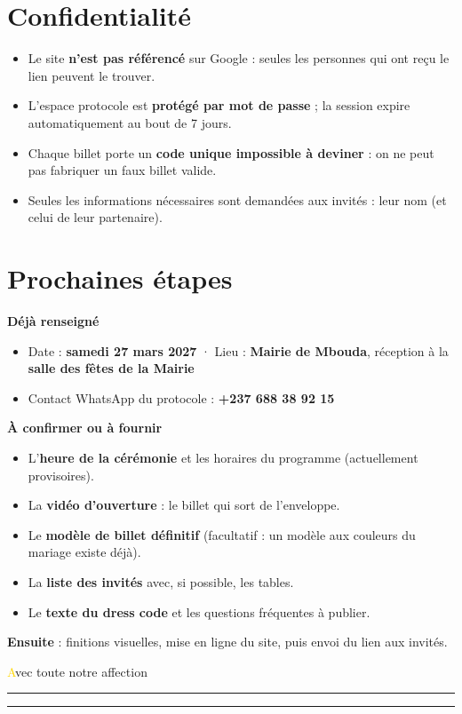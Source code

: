 \documentclass[11pt,a4paper]{article}
\newcommand{\ornament}{%
  \begin{center}
    \textcolor{gold}{\rule[0.6ex]{3.2cm}{0.4pt}\hspace{0.6em}\raisebox{0.15ex}{$\blacklozenge$}\hspace{0.6em}\rule[0.6ex]{3.2cm}{0.4pt}}
  \end{center}}
\begin{document}
\newpage
\section{Confidentialité}

\begin{itemize}
  \item Le site \textbf{n'est pas référencé} sur Google : seules les personnes qui ont reçu le lien peuvent le trouver.
  \item L'espace protocole est \textbf{protégé par mot de passe} ; la session expire automatiquement au bout de 7 jours.
  \item Chaque billet porte un \textbf{code unique impossible à deviner} : on ne peut pas fabriquer un faux billet valide.
  \item Seules les informations nécessaires sont demandées aux invités : leur nom (et celui de leur partenaire).
\end{itemize}

\section{Prochaines étapes}

\begin{note}
\textbf{Déjà renseigné}
\begin{itemize}
  \item Date : \textbf{samedi 27 mars 2027} · Lieu : \textbf{Mairie de Mbouda}, réception à la \textbf{salle des fêtes de la Mairie}
  \item Contact WhatsApp du protocole : \textbf{+237 688 38 92 15}
\end{itemize}

\textbf{À confirmer ou à fournir}
\begin{itemize}
  \item L'\textbf{heure de la cérémonie} et les horaires du programme (actuellement provisoires).
  \item La \textbf{vidéo d'ouverture} : le billet qui sort de l'enveloppe.
  \item Le \textbf{modèle de billet définitif} (facultatif : un modèle aux couleurs du mariage existe déjà).
  \item La \textbf{liste des invités} avec, si possible, les tables.
  \item Le \textbf{texte du dress code} et les questions fréquentes à publier.
\end{itemize}

\textbf{Ensuite} : finitions visuelles, mise en ligne du site, puis envoi du lien aux invités.
\end{note}

\vfill
\begin{center}
  {\weddingscript\fontsize{26}{30}\selectfont\textcolor{gold}{A}\textcolor{terracotta}{vec toute notre affection}}
  \ornament
\end{center}
\end{document}
